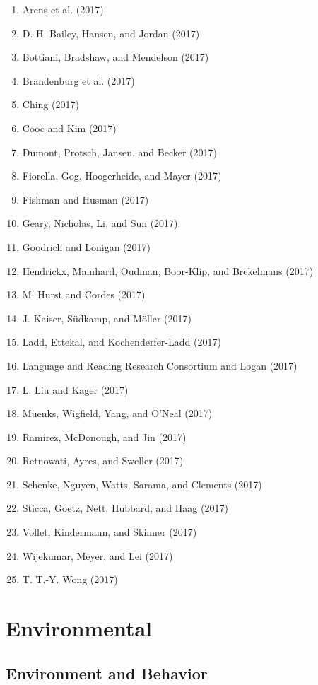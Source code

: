 \documentclass[english,man]{apa6}
\providecommand{\tightlist}{%
  \setlength{\itemsep}{0pt}\setlength{\parskip}{0pt}}
\theoremstyle{definition}
\theoremstyle{definition}
\theoremstyle{definition}
\theoremstyle{remark}
\begin{document}
\begin{enumerate}
\def\labelenumi{\arabic{enumi})}
\tightlist
\item
  Arens et al. (2017)
\item
  D. H. Bailey, Hansen, and Jordan (2017)
\item
  Bottiani, Bradshaw, and Mendelson (2017)
\item
  Brandenburg et al. (2017)
\item
  Ching (2017)
\item
  Cooc and Kim (2017)
\item
  Dumont, Protsch, Jansen, and Becker (2017)
\item
  Fiorella, Gog, Hoogerheide, and Mayer (2017)
\item
  Fishman and Husman (2017)
\item
  Geary, Nicholas, Li, and Sun (2017)
\item
  Goodrich and Lonigan (2017)
\item
  Hendrickx, Mainhard, Oudman, Boor-Klip, and Brekelmans (2017)
\item
  M. Hurst and Cordes (2017)
\item
  J. Kaiser, Südkamp, and Möller (2017)
\item
  Ladd, Ettekal, and Kochenderfer-Ladd (2017)
\item
  Language and Reading Research Consortium and Logan (2017)
\item
  L. Liu and Kager (2017)
\item
  Muenks, Wigfield, Yang, and O'Neal (2017)
\item
  Ramirez, McDonough, and Jin (2017)
\item
  Retnowati, Ayres, and Sweller (2017)
\item
  Schenke, Nguyen, Watts, Sarama, and Clements (2017)
\item
  Sticca, Goetz, Nett, Hubbard, and Haag (2017)
\item
  Vollet, Kindermann, and Skinner (2017)
\item
  Wijekumar, Meyer, and Lei (2017)
\item
  T. T.-Y. Wong (2017)
\end{enumerate}

\section{Environmental}\label{environmental}

\subsection{Environment and Behavior}\label{environment-and-behavior}
\end{document}
